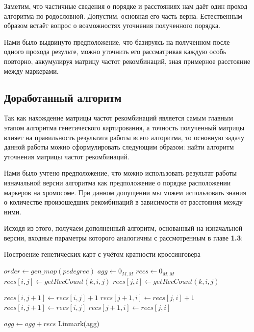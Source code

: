 \documentclass{matmex-diploma-custom}
\begin{document}
Заметим, что частичные сведения о порядке и расстояниях нам даёт один
проход алгоритма по родословной. Допустим, основная его часть
верна. Естественным образом встаёт вопрос о возможностях уточнения
полученного порядка.

Нами было выдвинуто предположение, что базируясь на полученном после
одного прохода результе, можно уточнить его рассматривая каждую особь
повторно, аккумулируя матрицу частот рекомбинаций, зная примерное
расстояние между маркерами.

\subsection{Доработанный алгоритм}

Так как нахождение матрицы частот рекомбинаций является самым главным
этапом алгоритма генетического картирования, а точность полученный
матрицы влияет на правильность результата работы всего алгоритма, то
основную задачу данной работы можно сформулировать следующим образом:
найти алгоритм уточнения матрицы частот рекомбинаций.

Нами было учтено предположение, что можно использовать результат
работы изначальной версии алгоритма как предположение о порядке
расположении маркеров на хромосоме. При данном допущении мы можем
использовать знания о количестве произошедших рекомбинаций в
зависимости от расстояния между ними.

Исходя из этого, получаем дополненный алгоритм, основанный на
изначальной версии, входные параметры которого аналогичны с
рассмотренным в главе \textbf{1.3}:

\begin{algorithm}
  \caption{Построение генетических карт с учётом кратности кроссинговера}
  \label{newalgo}
  \begin{algorithmic}[1]
    \State $order \gets gen\_map(pedegree)$
    \State $agg \gets 0_{M, M}$
    \State $recs \gets 0_{M, M}$
      \State $recs[i, j] \gets getRecCount(k, i, j)$
      \State $recs[j, i] \gets getRecCount(k, i, j)$
    \EndFor
    \EndFor


    \State $recs[i, j+1] \gets recs[i, j] +1$
    \State $recs[j+1, i] \gets recs[j, i] +1$
    \EndIf
    \State $recs[i, j+1] \gets recs[i, j]$
    \State $recs[j+1, i] \gets recs[j, i]$
    \EndIf

    \EndFor
    \EndFor
    \State $agg \gets agg + recs$
    \EndFor
    \State \Return Linmark(agg)
    \EndFunction
  \end{algorithmic}
\end{algorithm}
\end{document}
